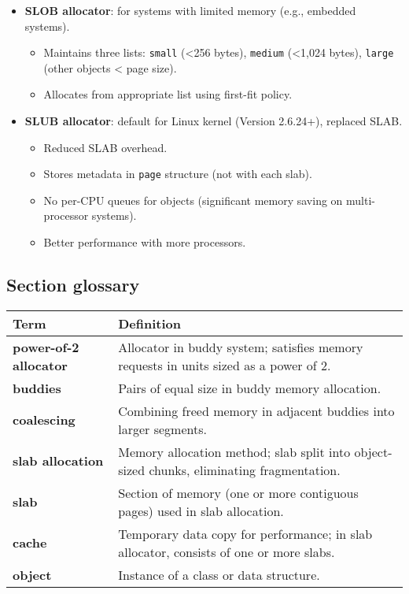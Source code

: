 \begin{itemize}
    \begin{itemize}
        \item \textbf{SLOB allocator}: for systems with limited memory (e.g., embedded systems).
        \begin{itemize}
            \item Maintains three lists: \texttt{small} (<256 bytes), \texttt{medium} (<1,024 bytes), \texttt{large} (other objects < page size).
            \item Allocates from appropriate list using first-fit policy.
        \end{itemize}
        \item \textbf{SLUB allocator}: default for Linux kernel (Version 2.6.24+), replaced SLAB.
        \begin{itemize}
            \item Reduced SLAB overhead.
            \item Stores metadata in \texttt{page} structure (not with each slab).
            \item No per-CPU queues for objects (significant memory saving on multi-processor systems).
            \item Better performance with more processors.
        \end{itemize}
    \end{itemize}
\end{itemize}

\vspace{1em}
\subsection*{Section glossary}
\begin{tabular}{p{}p{}}
    \toprule
    \rowcolor{gray!20} \textbf{Term} & \textbf{Definition} \\
    \midrule
    \textbf{power-of-2 allocator} & Allocator in buddy system; satisfies memory requests in units sized as a power of 2. \\
    \textbf{buddies} & Pairs of equal size in buddy memory allocation. \\
    \textbf{coalescing} & Combining freed memory in adjacent buddies into larger segments. \\
    \textbf{slab allocation} & Memory allocation method; slab split into object-sized chunks, eliminating fragmentation. \\
    \textbf{slab} & Section of memory (one or more contiguous pages) used in slab allocation. \\
    \textbf{cache} & Temporary data copy for performance; in slab allocator, consists of one or more slabs. \\
    \textbf{object} & Instance of a class or data structure. \\
    \bottomrule
\end{tabular}
